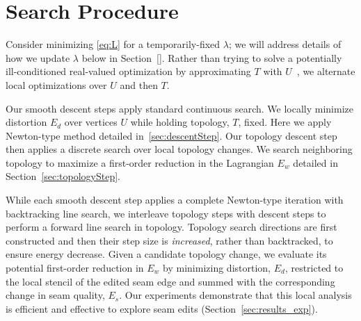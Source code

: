
\section{Search Procedure}%
\label{sec:DCSearch}

Consider minimizing \eqref{eq:L} for a temporarily-fixed $\lambda$; we will address details of how we update $\lambda$ below in Section\ \ref{}. Rather than trying to solve a potentially ill-conditioned real-valued optimization by approximating $T$ with $U$\ \cite{Poranne2017Autocuts}, we alternate local optimizations over $U$ and then $T$. %

Our smooth descent steps apply standard continuous search. We locally minimize distortion $E_d$ over vertices $U$ while holding topology, $T$, fixed. Here we apply Newton-type method detailed in~\ref{sec:descentStep}.
%
Our topology descent step then applies a discrete search over local topology changes. We search neighboring topology to maximize a first-order reduction in the Lagrangian $E_w$ detailed in Section~\ref{sec:topologyStep}. 

While each smooth descent step applies a complete Newton-type iteration with backtracking line search, we interleave topology steps with descent steps to perform a forward line search in topology.  Topology search directions are first constructed and then their step size is \emph{increased},  rather than backtracked, to ensure energy decrease. Given a candidate topology change, we evaluate its potential first-order reduction in $E_w$ by minimizing distortion, $E_d$, restricted to the local stencil of the edited seam edge and summed with the corresponding change in seam quality, $E_s$. Our experiments demonstrate that this local analysis is efficient and effective to explore seam edits (Section~\ref{sec:results_exp}).

